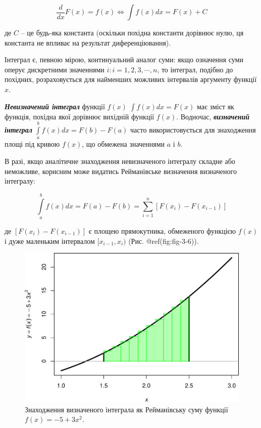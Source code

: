 \documentclass[
  11pt,
]{book}
\begin{document}
\[\frac{d}{dx}F(x) = f(x) \iff \int f(x) dx = F(x) + C\]

де \(C\) -- це будь-яка константа (оскільки похідна константи дорівнює
нулю, ця константа не впливає на результат диференціювання).

Інтеграл є, певною мірою, континуальний аналог суми: якщо означення суми
оперує дискретними значеннями \(i: i = 1, 2, 3, \cdots, n\), то
інтеграл, подібно до похідних, розраховується для найменших можливих
інтервалів аргументу функції \(x\).

\textbf{\emph{Невизначений інтеграл}} функції \(f(x)\)
\(\int f(x)dx = F(x)\) має зміст як функція, похідна якої дорівнює
вихідній функції \(f(x)\). Водночас, \textbf{\emph{визначений інтеграл}}
\(\int\limits_a^b f(x) dx = F(b) - F(a)\) часто використовується для
знаходження площі під кривою \(f(x)\), що обмежена значеннями \(a\) і
\(b\).

В разі, якщо аналітичне знаходження невизначеного інтегралу складне або
неможливе, корисним може видатись Рейманівське визначення визначеного
інтегралу:

\[\int\limits_a^b f(x) dx = F(a) - F(b) = \sum\limits_{i=1}^n [F(x_i) - F(x_{i-1})]\]

де \([F(x_i) - F(x_{i-1})]\) є площею прямокутника, обмеженого функцією
\(f(x)\) і дуже маленьким інтервалом \([x_{i-1}, x_i)\) (Рис.
@ref(fig:fig-3-6)).

\begin{figure}
\centering
\includegraphics{bookdown-demo_files/figure-latex/fig-3-6-1.pdf}
\caption{Знаходження визначеного інтеграла як Рейманівську суму функції
\(f(x) = -5 + 3x^2\).}
\end{figure}
\end{document}
